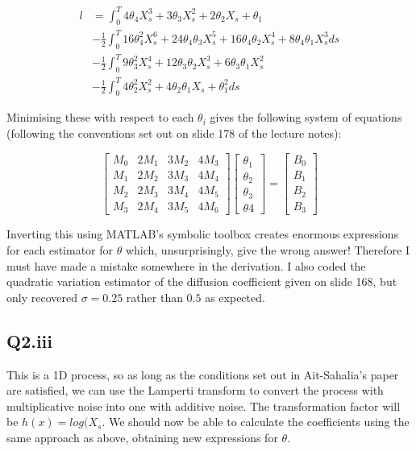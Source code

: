 \documentclass[11pt]{article} %
\begin{document}
\begin{align}
	l &= \int^{T}_{0}4\theta_{4}X_{s}^{3}+3\theta_{3}X_{s}^{2}+2\theta_{2}X_{s}+\theta_{1}\\
	&-\frac{1}{2}\int^{T}_{0}16\theta_{4}^{2}X_{s}^{6}+24\theta_{4}\theta_{3}X_{s}^{5}+16\theta_{4}\theta_{2}X_{s}^{4}
+8\theta_{4}\theta_{1}X_{s}^{3}ds\\
&-\frac{1}{2}\int^{T}_{0}9\theta_{3}^{2}X_{s}^{4}+12\theta_{3}\theta_{2}X_{s}^{3}+6\theta_{3}\theta_{1}X_{s}^{2}\\
&-\frac{1}{2}\int^{T}_{0}4\theta_{2}^{2}X_{s}^{2}+4\theta_{2}\theta_{1}X_{s}+\theta_{1}^{2}ds
\end{align}

Minimising these with respect to each $\theta_{i}$ gives the following system of equations (following the conventions set out on slide 178 of the lecture notes):

\begin{equation}
\begin{bmatrix} M_{0} & 2M_{1} & 3M_{2} & 4M_{3}\\M_{1} & 2M_{2} & 3M_{3} & 4M_{4}\\M_{2} & 2M_{3} & 3M_{4} & 4M_{5}\\M_{3} & 2M_{4} & 3M_{5} & 4M_{6}\end{bmatrix}\begin{bmatrix}\theta_{1} \\ \theta_{2}\\ \theta_{3} \\ \theta{4}\end{bmatrix} = \begin{bmatrix}B_{0}\\B_{1}\\B_{2}\\B_{3}\end{bmatrix}
\end{equation}

Inverting this using MATLAB's symbolic toolbox creates enormous expressions for each estimator for $\theta$ which, unsurprisingly, give the wrong answer! Therefore I must have made a mistake somewhere in the derivation. I also coded the quadratic variation estimator of the diffusion coefficient given on slide 168, but only recovered $\sigma = 0.25$ rather than $0.5$ as expected.

\subsection{Q2.iii}
This is a 1D process, so as long as the conditions set out in Ait-Sahalia's paper are satisfied, we can use the Lamperti transform to convert the process with multiplicative noise into one with additive noise. The transformation factor will be $h(x) = log(X_{s}$. We should now be able to calculate the coefficients using the same approach as above, obtaining new expressions for $\theta$.
\end{document}
